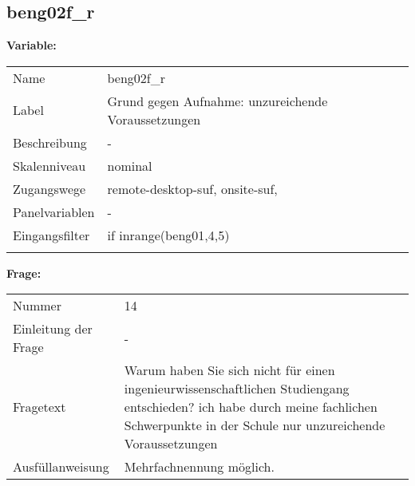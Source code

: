 	
	
	\subsection{beng02f\_r}
	\label{subSection:beng02f_r}

	\noindent\textbf{Variable:}\\
		\begin{tabular}{lL{11.3cm}}
			\label{tableVariable:beng02f_r}
			Name & beng02f\_r \\
			Label & Grund gegen Aufnahme: unzureichende Voraussetzungen \\
			Beschreibung & - \\
			Skalenniveau & nominal \\
			Zugangswege &
				remote-desktop-suf,
				onsite-suf,
 \\
			Panelvariablen & -
			 \\
			Eingangsfilter & if inrange(beng01,4,5) \\
 \\
		\end{tabular}

		\vspace*{1 cm}
		\noindent\textbf{Frage:}\\
		\begin{tabular}{lL{11.3cm}}
			\label{tableQuestion:beng02f_r}
			Nummer & 14 \\
			Einleitung der Frage & - \\
			Fragetext & Warum haben Sie sich nicht für einen ingenieurwissenschaftlichen Studiengang entschieden?
ich habe durch meine fachlichen Schwerpunkte in der Schule nur unzureichende Voraussetzungen \\
			Ausfüllanweisung & Mehrfachnennung möglich. \\
		\end{tabular}





